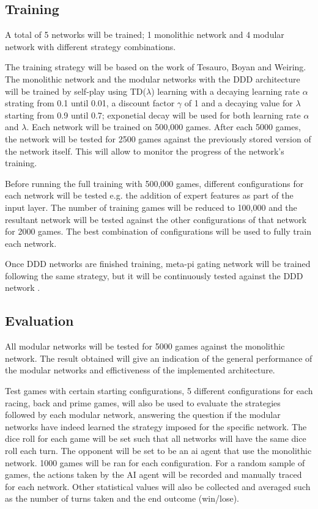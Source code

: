 \documentclass[12pt,a4paper]{article}
\begin{document}
\subsection{Training}
A total of 5 networks will be trained; 1 monolithic network and 4 modular network with different strategy combinations. 

The training strategy will be based on the work of Tesauro, Boyan and Weiring. The monolithic network and the modular networks with the DDD architecture will be trained by self-play using TD($\lambda$) learning with a decaying learning rate $\alpha$ strating from 0.1 until 0.01, a discount factor $\gamma$ of 1 and a decaying value for $\lambda$ starting from 0.9 until 0.7; exponetial decay will be used for both learning rate $\alpha$ and $\lambda$. Each network will be trained on 500,000 games. After each 5000 games, the network will be tested for 2500 games against the previously stored version of the network itself. This will allow to monitor the progress of the network's training. 

Before running the full training with 500,000 games, different configurations for each network will be tested e.g. the addition of expert features as part of the input layer. The number of training games will be reduced to 100,000 and the resultant network will be tested against the other configurations of that network for 2000 games. The best combination of configurations will be used to fully train each network.

Once DDD networks are finished training, meta-pi gating network will be trained following the same strategy, but it will be continuously tested against the DDD network .

\subsection{Evaluation}
All modular networks will be tested for 5000 games against the monolithic network. The result obtained will give an indication of the general performance of the modular networks and effictiveness of the implemented architecture. 

Test games with certain starting configurations, 5 different configurations for each racing, back and prime games, will also be used to evaluate the strategies followed by each modular network, answering the question if the modular networks have indeed learned the strategy imposed for the specific network. The dice roll for each game will be set such that all networks will have the same dice roll each turn. The opponent will be set to be an ai agent that use the monolithic network. 1000 games will be ran for each configuration. For a random sample of games, the actions taken by the AI agent will be recorded and manually traced for each network. Other statistical values will also be collected and averaged such as the number of turns taken and the end outcome (win/lose). 
\end{document}
